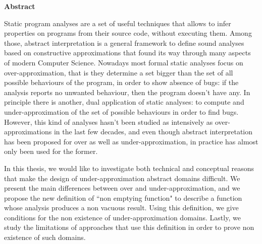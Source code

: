 \thispagestyle{plain}
\begin{center}
	\Large
	\textbf{\thesistitle}


	\vspace{1.2cm}
	\large
	\peopleheader
	\textbf{\authornamefl} \hfill \textbf{\supervisors}

	\vspace{2.0cm}
	\textbf{Abstract}
\end{center}
Static program analyses are a set of useful techniques that allows to infer properties on programs from their source code, without executing them. Among those, abstract interpretation is a general framework to define sound analyses based on constructive approximations that found its way through many aspects of modern Computer Science.
Nowadays most formal static analyses focus on over-approximation, that is they determine a set bigger than the set of all possible behaviours of the program, in order to show absence of bugs: if the analysis reports no unwanted behaviour, then the program doesn't have any.
In principle there is another, dual application of static analyses: to compute and under-approximation of the set of possible behaviours in order to find bugs. However, this kind of analyses hasn't been studied as intensively as over-approximations in the last few decades, and even though abstract interpretation has been proposed for over as well as under-approximation, in practice has almost only been used for the former.

In this thesis, we would like to investigate both technical and conceptual reasons that make the design of under-approximation abstract domains difficult. We present the main differences between over and under-approximation, and we propose the new definition of ``non emptying function" to describe a function whose analysis produces a non vacuous result. Using this definition, we give conditions for the non existence of under-approximation domains. Lastly, we study the limitations of approaches that use this definition in order to prove non existence of such domains.

